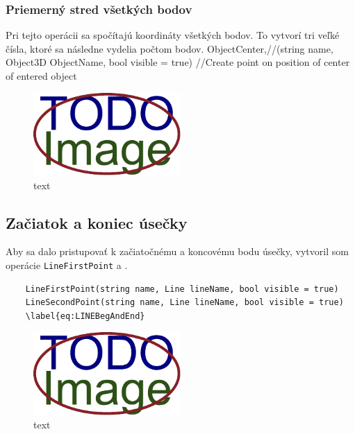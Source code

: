 \subsubsection{Priemerný stred všetkých bodov} 
Pri tejto operácii sa spočítajú koordináty všetkých bodov. To vytvorí tri veľké čísla, ktoré sa následne vydelia počtom bodov.
		ObjectCenter,//(string name, Object3D ObjectName, bool visible = true) //Create point on position of center of entered object

\begin{figure}[H]
	\centering
	\includegraphics[width=0.5\textwidth]{obrazky-figures/placeholder.pdf}
	\caption{text}
	\label{fig:1}
\end{figure}

\subsection{Začiatok a koniec úsečky}
Aby sa dalo pristupovať k začiatočnému a koncovému bodu úsečky, vytvoril som operácie \texttt{LineFirstPoint} a .
\label{sec:begandendofline}

\begin{lstlisting}
    LineFirstPoint(string name, Line lineName, bool visible = true)
	LineSecondPoint(string name, Line lineName, bool visible = true)
	\label{eq:LINEBegAndEnd}
\end{lstlisting}
		
		


\begin{figure}[H]
	\centering
	\includegraphics[width=0.5\textwidth]{obrazky-figures/placeholder.pdf}
	\caption{text}
	\label{fig:1}
\end{figure}



